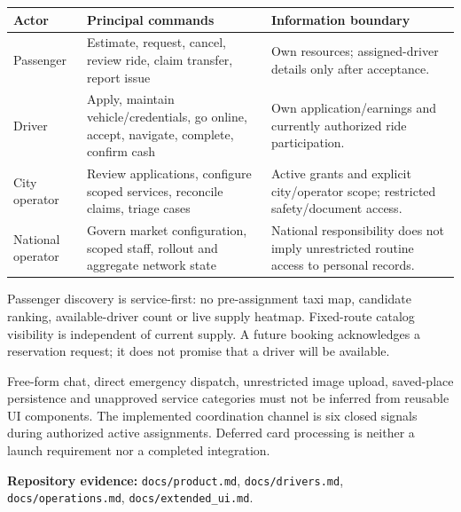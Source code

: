 \documentclass[11pt,a4paper]{article}
\newcommand{\src}[1]{{\small\nolinkurl{#1}}}
\newcommand{\evidence}[1]{\par\textbf{Repository evidence:} #1\par}
\begin{document}
\begin{tabularx}{\textwidth}{@{}p{}XX@{}}
\toprule Actor & Principal commands & Information boundary \\\midrule
Passenger & Estimate, request, cancel, review ride, claim transfer, report issue & Own resources; assigned-driver details only after acceptance. \\
Driver & Apply, maintain vehicle/credentials, go online, accept, navigate, complete, confirm cash & Own application/earnings and currently authorized ride participation. \\
City operator & Review applications, configure scoped services, reconcile claims, triage cases & Active grants and explicit city/operator scope; restricted safety/document access. \\
National operator & Govern market configuration, scoped staff, rollout and aggregate network state & National responsibility does not imply unrestricted routine access to personal records. \\
\bottomrule
\end{tabularx}

Passenger discovery is service-first: no pre-assignment taxi map, candidate
ranking, available-driver count or live supply heatmap. Fixed-route catalog
visibility is independent of current supply. A future booking acknowledges a
reservation request; it does not promise that a driver will be available.

Free-form chat, direct emergency dispatch, unrestricted image upload, saved-place
persistence and unapproved service categories must not be inferred from reusable
UI components. The implemented coordination channel is six closed signals during
authorized active assignments. Deferred card processing is neither a launch
requirement nor a completed integration.
\evidence{\src{docs/product.md}, \src{docs/drivers.md}, \src{docs/operations.md}, \src{docs/extended_ui.md}.}
\end{document}
